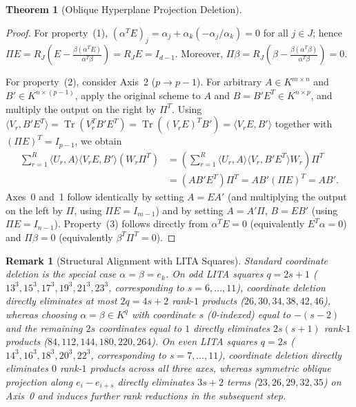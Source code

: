 \documentclass[11pt,a4paper]{article}
\newtheorem{theorem}{Theorem}
\newtheorem{remark}{Remark}
\begin{document}
\begin{theorem}[Oblique Hyperplane Projection Deletion]
\begin{enumerate}
\end{enumerate}
\end{theorem}

\begin{proof}
For property~(1), $(\alpha^T E)_j = \alpha_j + \alpha_k(-\alpha_j/\alpha_k) = 0$ for all $j\in J$; hence $\Pi E = R_J(E - \frac{\beta(\alpha^T E)}{\alpha^T\beta}) = R_J E = I_{d-1}$. Moreover, $\Pi \beta = R_J(\beta - \frac{\beta(\alpha^T\beta)}{\alpha^T\beta}) = 0$.

For property~(2), consider Axis~2 ($p\to p-1$). For arbitrary $A \in K^{m\times n}$ and $B' \in K^{n\times(p-1)}$, apply the original scheme to $A$ and $B = B' E^T \in K^{n\times p}$, and multiply the output on the right by $\Pi^T$. Using $\langle V_r, B' E^T\rangle = \operatorname{Tr}(V_r^T B' E^T) = \operatorname{Tr}((V_r E)^T B') = \langle V_r E, B'\rangle$ together with $(\Pi E)^T = I_{p-1}$, we obtain
\begin{align*}
\sum_{r=1}^R \langle U_r, A\rangle \langle V_r E, B'\rangle (W_r \Pi^T)
&= \left(\sum_{r=1}^R \langle U_r, A\rangle \langle V_r, B' E^T\rangle W_r\right)\Pi^T \\
&= (A B' E^T)\Pi^T = A B' (\Pi E)^T = A B'.
\end{align*}
Axes~0 and~1 follow identically by setting $A = E A'$ (and multiplying the output on the left by $\Pi$, using $\Pi E = I_{m-1}$) and by setting $A = A'\Pi$, $B = E B'$ (using $\Pi E = I_{n-1}$). Property~(3) follows directly from $\alpha^T E = 0$ (equivalently $E^T \alpha = 0$) and $\Pi\beta = 0$ (equivalently $\beta^T \Pi^T = 0$).
\end{proof}

\begin{remark}[Structural Alignment with LITA Squares]
Standard coordinate deletion is the special case $\alpha = \beta = e_k$. On odd LITA squares $q = 2s+1$ ($13^3, 15^3, 17^3, 19^3, 21^3, 23^3$, corresponding to $s = 6,\dots,11$), coordinate deletion directly eliminates at most $2q = 4s+2$ rank-$1$ products ($26, 30, 34, 38, 42, 46$), whereas choosing $\alpha = \beta \in K^q$ with coordinate $s$ (0-indexed) equal to $-(s-2)$ and the remaining $2s$ coordinates equal to $1$ directly eliminates $2s(s+1)$ rank-$1$ products ($84, 112, 144, 180, 220, 264$). On even LITA squares $q = 2s$ ($14^3, 16^3, 18^3, 20^3, 22^3$, corresponding to $s = 7,\dots,11$), coordinate deletion directly eliminates $0$ rank-$1$ products across all three axes, whereas symmetric oblique projection along $e_i - e_{i+s}$ directly eliminates $3s+2$ terms ($23, 26, 29, 32, 35$) on Axis~0 and induces further rank reductions in the subsequent step.
\end{remark}
\end{document}
